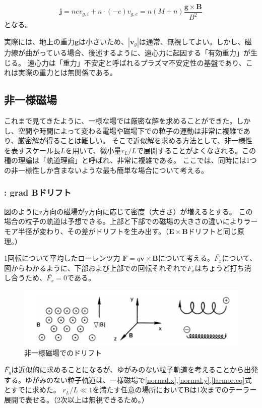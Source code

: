\documentclass{ltjsarticle}
\numberwithin{equation}{section} %
\begin{document}
\begin{equation}
  \bm{j} = nev_{g,i} + n\cdot (-e)v_{g,e} = n(M+n)\frac{\bm{g}\times \bm{B}}{B^2}
\end{equation}
となる。

実際には、地上の重力$\bm{g}$は小さいため、$|\bm{v}_g|$は通常、無視してよい。しかし、磁力線が曲がっている場合、後述するように、遠心力に起因する「有効重力」が生じる。
遠心力は「重力」不安定と呼ばれるプラズマ不安定性の基盤であり、これは実際の重力とは無関係である。

\subsection{非一様磁場}
これまで見てきたように、一様な場では厳密な解を求めることができた。しかし、空間や時間によって変わる電場や磁場下での粒子の運動は非常に複雑であり、厳密解が得ることは難しい。
そこで近似解を求める方法として、非一様性を表すスケール長$L$を用いて、微小量$r_L/L$で展開することがよくなされる。この種の理論は「軌道理論」と呼ばれ、非常に複雑である。
ここでは、同時には1つの非一様性しか含まないような最も簡単な場合について考える。

\subsubsection{\nabla {} \perp {} : grad Bドリフト}
図のようにz方向の磁場がy方向に応じて密度（大きさ）が増えるとする。
この場合の粒子の軌道は予想できる。上部と下部での磁場の大きさの違いによりラーモア半径が変わり、その差がドリフトを生み出す。（$\bm{E}\times \bm{B}$ドリフトと同じ原理。）

1回転について平均したローレンツ力 $\bm{F} = q\bm{v} \times \bm{B}$について考える。$\bar{F_x}$について、図からわかるように、下部および上部での回転それぞれで$F_x$はちょうど打ち消し合うため、$\bar{F_x}=0$である。

\begin{figure}[htbp]
  \centering
  \includegraphics[width=0.7\linewidth]{gradB_drift.png}
  \caption{非一様磁場でのドリフト}
  \label{fig.gradB_drift}
\end{figure}

$\bar{F_y}$は近似的に求めることになるが、ゆがみのない粒子軌道を考えることから出発する。ゆがみのない粒子軌道は、一様磁場で\eqref{normal.x},\eqref{normal.y},\eqref{larmor.eq}式とすでに求めた。
$r_L/L\ll 1$を満たす任意の場所において$\bm{B}$は1次までのテーラー展開で表せる。（2次以上は無視できるため。）
\end{document}
